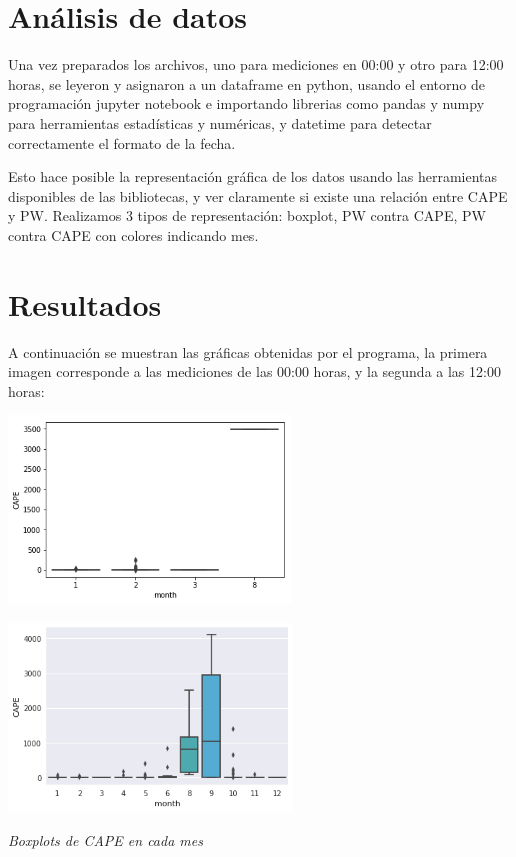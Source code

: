 \documentclass[a4paper]{article}
\begin{document}
\section{Análisis de datos}

Una vez preparados los archivos, uno para mediciones en 00:00 y otro para 12:00 horas, se leyeron y asignaron a un dataframe en python, usando el entorno de programación jupyter notebook e importando librerias como pandas y numpy para herramientas estadísticas y numéricas, y datetime para detectar correctamente el formato de la fecha.

Esto hace posible la representación gráfica de los datos usando las herramientas disponibles de las bibliotecas, y ver claramente si existe una relación entre CAPE y PW. Realizamos 3 tipos de representación: boxplot, PW contra CAPE, PW contra CAPE con colores indicando mes.


\section{Resultados}

A continuación se muestran las gráficas obtenidas por el programa, la primera imagen corresponde a las mediciones de las 00:00 horas, y la segunda a las 12:00 horas:

\begin{center}
	\includegraphics[height=5cm]{Z001.png}
    
    \includegraphics[height=5cm]{Z121.png}
    
    \textit{Boxplots de CAPE en cada mes}
\end{center}
\end{document}
